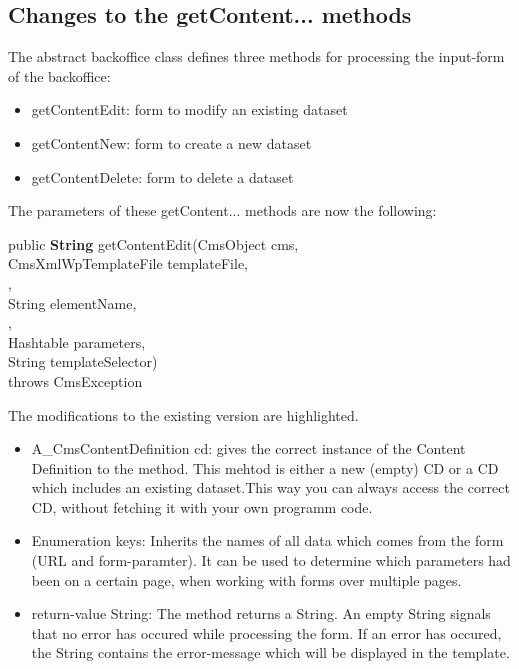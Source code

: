 \subsection{Changes to the getContent... methods}
The abstract backoffice class defines three methods for processing the 
input-form of the backoffice:

\begin{itemize}
\item getContentEdit: form to modify an existing dataset
\item getContentNew:  form to create a new dataset
\item getContentDelete: form to delete a dataset
\end{itemize}

The parameters of these getContent... methods are now the following:

\begin{java}
public {\bf String} getContentEdit(CmsObject cms,\\
\jtabf CmsXmlWpTemplateFile templateFile,\\
,\\
\jtabf String elementName,\\
,\\
\jtabf Hashtable parameters,\\
\jtabf String templateSelector)\\
\jtabf throws CmsException
\end{java}
The modifications to the existing version are highlighted.

\begin{itemize}
\item A\_CmsContentDefinition cd: gives the correct instance of the Content Definition
	to the method. This mehtod is either a new (empty) CD or a CD which includes
	an existing dataset.This way you can always access the correct CD, without 
	fetching it with your own programm code.
\item Enumeration keys: Inherits the names of all data which comes from the form
	(URL and form-paramter). It can be used to determine which parameters had 
	been on a certain page, when working with forms over multiple pages.
\item return-value String: The method returns a String. An empty String signals that
	no error has occured while processing the form. If an error has occured, the 
	String contains the error-message which will be displayed in the template.
\end{itemize}

